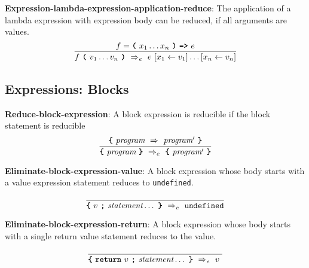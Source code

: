 \vspace{10mm}
\textbf{Expression-lambda-expression-application-reduce}:
The application of a lambda expression with expression body
can be reduced, if all arguments are values. 
\[
\frac{
  f = \textbf{\texttt{(}}\  x_1 \ldots x_n
                 \ \textbf{\texttt{)}}\ \textbf{\texttt{=>}}\ e
}{
  f\ \textbf{\texttt{(}}\ v_1 \ldots v_n\ \textbf{\texttt{)}}
  \ \Rightarrow_e \ 
  e\ [x_1 \leftarrow v_1]\ldots[x_n \leftarrow v_n]
}
\]


\subsection*{Expressions: Blocks}

\textbf{Reduce-block-expression}: A block expression is
reducible if the block statement is reducible
\[
\frac{
  \textbf{\texttt{\{}} \
  \textit{program} 
\ \Rightarrow \ 
  \textit{program}'  \ 
  \textbf{\texttt{\}}}
}{  
  \textbf{\texttt{\{}} \
  \textit{program} \ 
  \textbf{\texttt{\}}}
\  \Rightarrow_e \ 
  \textbf{\texttt{\{}} \
  \textit{program}' \ 
  \textbf{\texttt{\}}}
}
\]

\vspace{10mm}

\textbf{Eliminate-block-expression-value}: A block expression
whose body starts with a value expression statement reduces to
\lstinline{undefined}.

\[
\frac{
}{  
  \textbf{\texttt{\{}} \
  v \ 
  \textbf{\texttt{;}} \ 
  \textit{statement} \ldots\ 
  \textbf{\texttt{\}}}
\  \Rightarrow_e \ 
  \texttt{undefined}
}
\]

\vspace{10mm}

\textbf{Eliminate-block-expression-return}: A block expression
whose body starts with a single return value statement reduces to
the value.

\[
\frac{
}{  
  \textbf{\texttt{\{}} \
  \textbf{\texttt{return}} \ v \ 
  \textbf{\texttt{;}} \
  \textit{statement} \ldots\ 
  \textbf{\texttt{\}}}
\  \Rightarrow_e \ 
v \ 
}
\]





    
